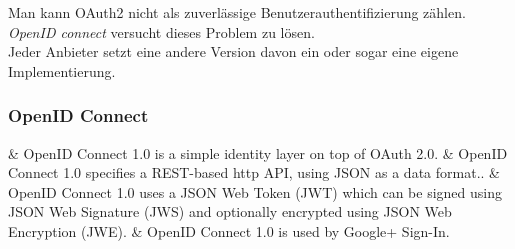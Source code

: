 Man kann OAuth2 nicht als zuverlässige Benutzerauthentifizierung zählen. \textit{OpenID connect} versucht dieses Problem zu lösen.\\

Jeder Anbieter setzt eine andere Version davon ein oder sogar eine eigene Implementierung.

\subsubsection{OpenID Connect}
\begin{easylist}[itemize]
	& OpenID Connect 1.0 is a simple identity layer on top of OAuth 2.0.
	& OpenID Connect 1.0 specifies a REST-based http API, using JSON as a data format..
	& OpenID Connect 1.0 uses a JSON Web Token (JWT) which can be signed using JSON Web Signature (JWS) and optionally encrypted using JSON Web Encryption (JWE).
	& OpenID Connect 1.0 is used by Google+ Sign-In.
\end{easylist}